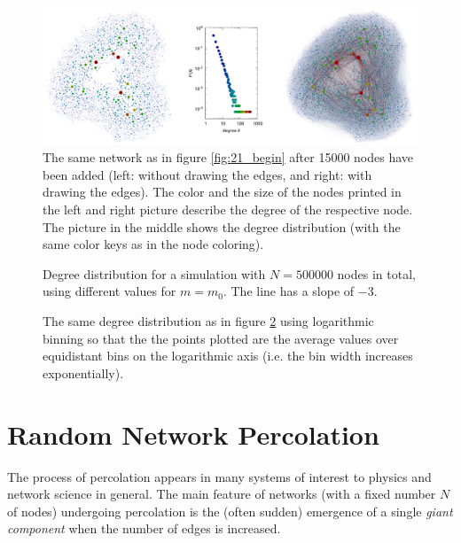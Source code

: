 \documentclass{scrartcl}
\begin{document}
\begin{figure}
    \includegraphics[width=\textwidth]{pictures/21_end.pdf}
    \caption{The same network as in figure \ref{fig:21_begin} after 15000
    nodes have been added (left: without drawing the edges, and right: with
    drawing the edges). The color and the size of the nodes printed in the left
    and right picture describe the degree of the respective node. The
    picture in the middle shows the degree distribution (with the same color
    keys as in the node coloring).}
    \label{fig:21_end}
\end{figure}

\begin{figure}
    \caption{Degree distribution for a simulation with $N=500000$ nodes
    in total, using different values for $m=m_0$. The line has a slope of
    $-3$.}
    \label{fig:22_plot}
\end{figure}
\begin{figure}
    \caption{The same degree distribution as in figure \ref{fig:22_plot}
    using logarithmic binning so that the the points plotted are the average
    values over equidistant bins on the logarithmic axis (i.e. the bin width
    increases exponentially).}
    \label{fig:22_logplot}
\end{figure}

\clearpage
\clearpage


\section{Random Network Percolation}
The process of percolation appears in many systems of interest to physics
and network science in general. The main feature of networks (with a fixed
number $N$ of nodes) undergoing percolation is the (often sudden) emergence
of a single \emph{giant component} when the number of edges is increased.
\end{document}
